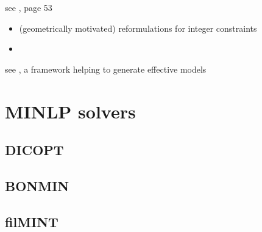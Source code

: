 \documentclass{article}
\begin{document}
\noindent
see \cite{sager2005numerical}, page 53
\begin{itemize}
\item (geometrically motivated) reformulations for integer constraints
\item 
\end{itemize}

\noindent
see \cite{raman1994modelling}, 
a framework helping to generate effective models
\section{MINLP solvers}
\subsection{DICOPT}

\subsection{BONMIN}
\cite{bonami2008algorithmic}

\subsection{filMINT}
\cite{abhishek2010filmint}

{}

\end{document}
